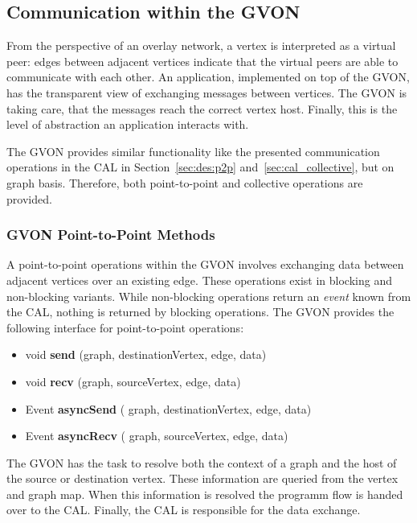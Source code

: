 \subsection{Communication within the GVON}
From the perspective of an overlay network, a vertex is interpreted as
a virtual peer: edges between adjacent vertices indicate that the
virtual peers are able to communicate with each other. An application,
implemented on top of the GVON, has the transparent view of exchanging
messages between vertices. The GVON is taking care, that the messages
reach the correct vertex host.  Finally, this is the level of
abstraction an application interacts with.

The GVON provides similar functionality like the presented
communication operations in the CAL in Section~\ref{sec:des:p2p}
and~\ref{sec:cal_collective}, but on graph basis. Therefore, both
point-to-point and collective operations are provided.

\subsubsection*{GVON Point-to-Point Methods}
A point-to-point operations within the GVON involves exchanging data
between adjacent vertices over an existing edge.  These operations
exist in blocking and non-blocking variants. While non-blocking
operations return an \emph{event} known from the CAL, nothing is returned by
blocking operations. The GVON provides the following interface for
point-to-point operations:

\begin{itemize}
  \item  void \textbf{send} (graph, destinationVertex, edge, data)
  \item  void \textbf{recv} (graph, sourceVertex, edge, data)
  \item  Event \textbf{asyncSend} ( graph, destinationVertex, edge, data)
  \item  Event \textbf{asyncRecv} ( graph, sourceVertex, edge, data)
\end{itemize}

\noindent The GVON has the task to resolve both the context of a graph
and the host of the source or destination vertex. These information are
queried from the vertex and graph map. When this information is
resolved the programm flow is handed over to the CAL. Finally, the CAL
is responsible for the data exchange.

